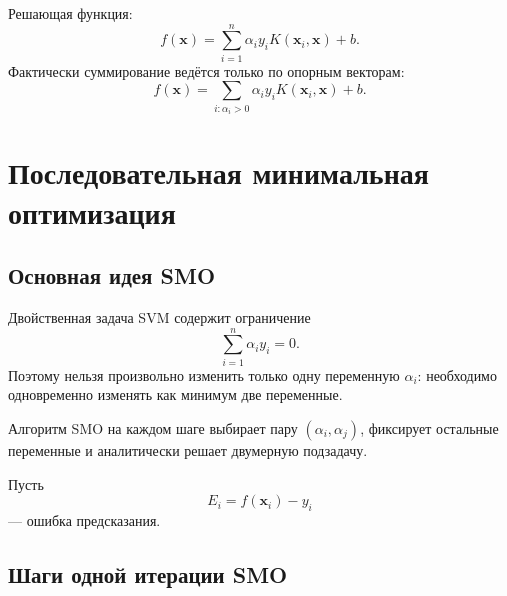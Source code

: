\documentclass[12pt,a4paper]{article}
\theoremstyle{definition}
\newcommand{\1}{\mathbf{1}}
\begin{document}
Решающая функция:
\[
    f(\bm{x})
    =
    \sum_{i=1}^{n}
    \alpha_i y_iK(\bm{x}_i,\bm{x})
    +
    b.
\]
Фактически суммирование ведётся только по опорным векторам:
\[
    f(\bm{x})
    =
    \sum_{i:\alpha_i>0}
    \alpha_i y_iK(\bm{x}_i,\bm{x})
    +
    b.
\]

\section{Последовательная минимальная оптимизация}

\subsection{Основная идея SMO}

Двойственная задача SVM содержит ограничение
\[
    \sum_{i=1}^{n}\alpha_i y_i=0.
\]
Поэтому нельзя произвольно изменить только одну переменную
$\alpha_i$: необходимо одновременно изменять как минимум две
переменные.

Алгоритм SMO на каждом шаге выбирает пару $(\alpha_i,\alpha_j)$,
фиксирует остальные переменные и аналитически решает двумерную
подзадачу.

Пусть
\[
    E_i=f(\bm{x}_i)-y_i
\]
--- ошибка предсказания.

\subsection{Шаги одной итерации SMO}
\end{document}
